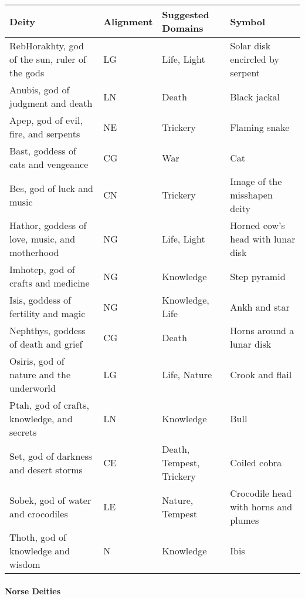 \documentclass[
]{article}
\begin{document}
\begin{longtable}[]{@{}llll@{}}
\toprule
Deity & Alignment & Suggested Domains & Symbol\tabularnewline
\midrule
\endhead
RebHorakhty, god of the sun, ruler of the gods & LG & Life, Light &
Solar disk encircled by serpent\tabularnewline
Anubis, god of judgment and death & LN & Death & Black
jackal\tabularnewline
Apep, god of evil, fire, and serpents & NE & Trickery & Flaming
snake\tabularnewline
Bast, goddess of cats and vengeance & CG & War & Cat\tabularnewline
Bes, god of luck and music & CN & Trickery & Image of the misshapen
deity\tabularnewline
Hathor, goddess of love, music, and motherhood & NG & Life, Light &
Horned cow's head with lunar disk\tabularnewline
Imhotep, god of crafts and medicine & NG & Knowledge & Step
pyramid\tabularnewline
Isis, goddess of fertility and magic & NG & Knowledge, Life & Ankh and
star\tabularnewline
Nephthys, goddess of death and grief & CG & Death & Horns around a lunar
disk\tabularnewline
Osiris, god of nature and the underworld & LG & Life, Nature & Crook and
flail\tabularnewline
Ptah, god of crafts, knowledge, and secrets & LN & Knowledge &
Bull\tabularnewline
Set, god of darkness and desert storms & CE & Death, Tempest, Trickery &
Coiled cobra\tabularnewline
Sobek, god of water and crocodiles & LE & Nature, Tempest & Crocodile
head with horns and plumes\tabularnewline
Thoth, god of knowledge and wisdom & N & Knowledge & Ibis\tabularnewline
\bottomrule
\end{longtable}

\hypertarget{norse-deities}{%
\paragraph{Norse Deities}\label{norse-deities}}
\end{document}
